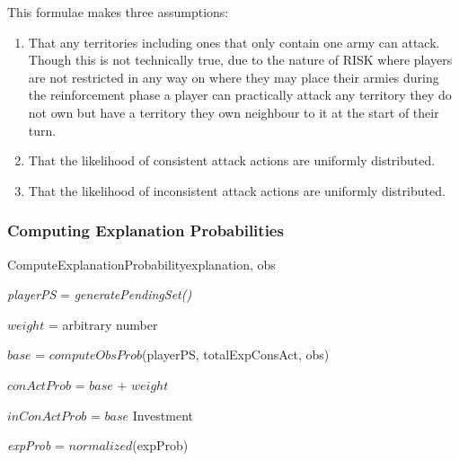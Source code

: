 \documentclass[parskip]{cs4rep}
\begin{document}
This formulae makes three assumptions:

\begin{enumerate}
\item
That any territories including ones that only contain one army can attack. Though this is not technically true, due to the nature of RISK where players are not restricted in any way on where they may place their armies during the reinforcement phase a player can practically attack any territory they do not own but have a territory they own neighbour to it at the start of their turn.
\item
That the likelihood of consistent attack actions are uniformly distributed.
\item
That the likelihood of inconsistent attack actions are uniformly distributed.
\end{enumerate}

\subsubsection{Computing Explanation Probabilities}

\begin{pseudocode}[ruled]{ComputeExplanationProbability}{explanation, obs}
\begin{algorithm}[H]


\textit{playerPS} = \textit{generatePendingSet()} \newline

$weight$ = arbitrary number

$base$ = $computeObsProb$(playerPS, totalExpConsAct, obs)\newline

$conActProb$ = $base$ + $weight$

$inConActProb$ = $base$ \newline
Investment

\textit{expProb} = $normalized$(expProb)

\end{algorithm}
\end{pseudocode}
\end{document}
